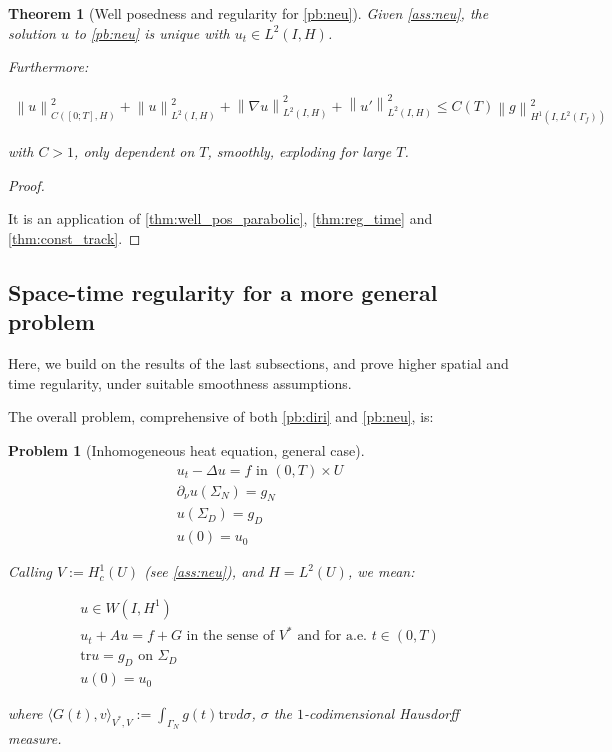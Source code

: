 \documentclass[english,a4paper,10pt,oneside]{scrbook}	%
\theoremstyle{break}
\newtheorem{thm}[equation]{Theorem}
\newtheorem{pb}[equation]{Problem}
\newenvironment{mproof}[1][\proofname]{%
  \begin{proof}[#1]$ $\par\nobreak\ignorespaces
}{%
  \end{proof}
}
\renewcommand*{\proofname}{Proof}
\theoremstyle{remark}
\newcommand{\norm}[1]{\left\lVert#1\right\rVert}
\newcommand{\tr}{\text{tr}}
\begin{document}
\begin{thm}[Well posedness and regularity for \cref{pb:neu}]
\label{prop:wp_neu}
Given \cref{ass:neu}, the solution $u$ to \cref{pb:neu} is unique with $u_t \in L^2(I,H)$.

Furthermore: 

\begin{align}
\norm{u}^2_{C([0;T],H)}+\norm{u}_{L^2(I,H)}^2+ \norm{\nabla u}_{L^2(I,H)}^2 + \norm{u'}^2_{L^2(I,H)}\leq C(T)\norm{g}_{H^1(I,L^2(\Gamma_f))}^2
\end{align}

with $C>1$, only dependent on $T$, smoothly, exploding for large $T$.
\end{thm}
\begin{mproof}

It is an application of \cref{thm:well_pos_parabolic}, \cref{thm:reg_time} and \cref{thm:const_track}.
\end{mproof}

\subsection{Space-time regularity for a more general problem}

Here, we build on the results of the last subsections, and prove higher spatial and time regularity, under suitable smoothness assumptions.

The overall problem, comprehensive of both \cref{pb:diri} and \cref{pb:neu}, is:

\begin{pb}[Inhomogeneous heat equation, general case]
\label{pb:mix}
\begin{align*}
u_t - \Delta u = f \text{ in } (0,T)\times U\\
\partial_\nu u(\Sigma_N)=g_N\\
u(\Sigma_D)=g_D\\
u(0)=u_0
\end{align*}

Calling $V:=H^1_{c}(U)$ (see \cref{ass:neu}), and $H=L^2(U)$, we mean:

\begin{align*}
u \in W(I,H^1) \\
u_t + A u = f + G \text{ in the sense of } V^* \text{ and for a.e. } t \in (0,T) \\
\tr u =g_D \text{ on } \Sigma_D\\
u(0)=u_0
\end{align*}

where $\langle G(t), v \rangle_{V^*,V}:=\int_{\Gamma_N} g(t)\tr v d\sigma$, $\sigma$ the $1$-codimensional Hausdorff measure.

\end{pb}
\end{document}
